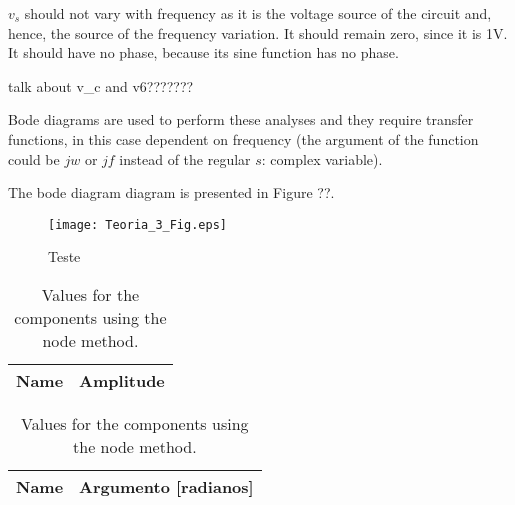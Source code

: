 $v_s$ should not vary with frequency as it is the voltage source of the circuit and, hence, the source of the frequency variation. It should remain zero, since it is 1V. It should have no phase, because its sine function has no phase.

talk about v_c and v6???????

Bode diagrams are used to perform these analyses and they require transfer functions, in this case dependent on frequency (the argument of the function could be $jw$ or $jf$ instead of the regular $s$: complex variable).

The bode diagram diagram is presented in Figure ??.






\begin{figure}[!ht]
\caption{Teste}
\texttt{[image: Teoria\_3\_Fig.eps]}
\end{figure}

\begin{table}[h]
  \centering
  \begin{tabular}{|l|r|}
    \hline    
    {\bf Name} & {\bf Amplitude} \\ \hline
    
  \end{tabular}
  \caption{Values for the components using the node method.}
  \label{tab4_Amp}
\end{table}


\begin{table}[h]
  \centering
  \begin{tabular}{|l|r|}
    \hline    
    {\bf Name} & {\bf Argumento [radianos]} \\ \hline
    
  \end{tabular}
  \caption{Values for the components using the node method.}
  \label{tab4_Arg}
\end{table}

